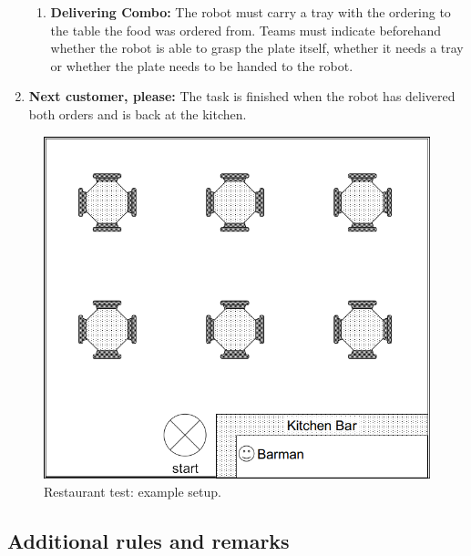 \begin{enumerate}
\begin{enumerate}
		\item \textbf{Delivering Combo:}  The robot must carry a tray with the ordering to the table the food was ordered from. Teams must indicate beforehand whether the robot is able to grasp the plate itself, whether it needs a tray or whether the plate needs to be handed to the robot.
	\end{enumerate}

	\item \textbf{Next customer, please:} The task is finished when the robot has delivered both orders and is back at the kitchen.
\end{enumerate}

\begin{figure}[tbp]
	\centering
	\includegraphics[width=0.5\columnwidth]{images/restaurant.png}
	\caption{Restaurant test: example setup.}
	\label{fig:restaurant}
\end{figure}

\subsection{Additional rules and remarks}

